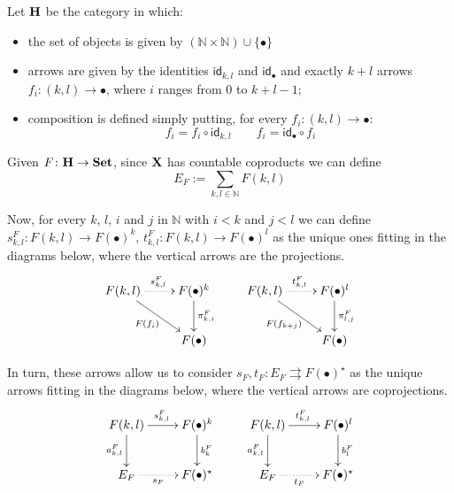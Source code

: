 \documentclass[runningheads,envcountsect]{llncs}
\def\X{\textbf {\textup{X}}}
\newcommand{\catname}[1]{\textbf{\textup{#1}}}
\newcommand{\id}[1]{\mathsf{id}_{#1}}
\begin{document}
\begin{definition}Let $\catname{H}$ be the category in which:
	\begin{itemize}
		\item the set of objects is given by $ (\mathbb{N}\times \mathbb{N}) \cup \{\bullet\}$
		\item arrows are given by the identities $\id{k,l}$ and $\id{\bullet}$ and exactly $k+l$ arrows $f_i\colon (k,l)\rightarrow \bullet$, where $i$ ranges from $0$ to $k+l-1$;
		\item composition is defined simply putting, for every $f_i\colon (k,l)\rightarrow \bullet$:
		\begin{equation*}
			f_i=f_i\circ \id{k,l} \qquad f_i = \id{\bullet}\circ f_i 
		\end{equation*}
	\end{itemize}
\end{definition}

Given $F\colon \catname{H}\to \catname{Set}$, since $\X$ has countable coproducts we can define
\[E_F:=\sum_{k,l\in \mathbb{N}}F(k,l)\]

Now, for every $k$, $l$, $i$ and $j$ in $\mathbb{N}$ with $i< k$ and $j< l$ we can define $s^F_{k,l}\colon F(k,l)\to F(\bullet)^k$,  $t^F_{k,l}\colon F(k,l)\to F(\bullet)^l$ as the unique ones fitting in the diagrams below, where the vertical arrows are the projections.
\[\xymatrix{F(k,l)  \ar@{.>}[r]^{s^F_{k,l}} \ar[dr]_{F(f_i)}& F(\bullet)^{k} \ar[d]^{\pi^F_{k,i}} & F(k,l) \ar@{.>}[r]^{t^F_{k,l}} \ar[dr]_{F(f_{k+j})} & F(\bullet)^{l} \ar[d]^{\pi^F_{l,j}} \\ & F(\bullet) && F(\bullet)}\]

In turn, these arrows allow us to consider
$s_F, t_F\colon E_F\rightrightarrows F(\bullet)^{\star}$ as the unique arrows fitting in the diagrams below, where the vertical arrows are coprojections.
\[\xymatrix{F(k,l) \ar[d]_{a^F_{k,l}}  \ar[r]^{s^{F}_{k,l}}& F(\bullet)^{k} \ar[d]^{b^F_{k}} & F(k,l) \ar[d]_{a^F_{k,l}}  \ar[r]^{t^{F}_{k,l}}& F(\bullet)^{l} \ar[d]^{b^F_{l}}\\ E_F \ar@{.>}[r]_-{s_F}& F(\bullet)^\star & E_F \ar@{.>}[r]_-{t_F}& F(\bullet)^\star}\]
\end{document}
